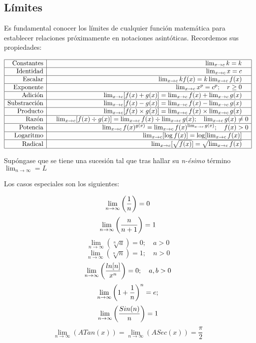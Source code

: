 \documentclass[tikz,11pt,fleqn]{book} %
\begin{document}
\subsection{Límites}
Es fundamental conocer los límites de cualquier función matemática para establecer relaciones próximamente en notaciones asintóticas. Recordemos sus propiedades:

$$\begin{array} {|r|r|}
    \hline  \text{Constantes}
        & \quad\lim_{x\to c}k
        =k    \quad\\
    \hline  \text{Identidad}
        & \quad\lim_{x\to c}x
        =c    \quad\\
    \hline  \text{Escalar}
        & \quad\lim_{x\to c}kf(x)
        =k\lim_{x\to c}f(x)    \quad\\
    \hline  \text{Exponente}
        & \quad\lim_{x\to c}x^p
        =c^p;    \quad r\ge0\quad\\
    \hline  \text{Adición}
        & \quad\lim_{x\to c}[f(x)+g(x)]
        =\lim_{x\to c}f(x)+\lim_{x\to c}g(x)    \quad\\
    \hline  \text{Substracción}
        & \quad\lim_{x\to c}[f(x)-g(x)]
        =\lim_{x\to c}f(x)-\lim_{x\to c}g(x)    \quad\\
    \hline  \text{Producto}
        & \quad\lim_{x\to c}[f(x)\times g(x)]
        =\lim_{x\to c}f(x)\times\lim_{x\to c}g(x)    \quad\\
    \hline  \text{Razón}
        & \quad\lim_{x\to c}[f(x)\div g(x)]
        =\lim_{x\to c}f(x)\div\lim_{x\to c}g(x);
        \quad \lim_{x\to c}g(x)\ne0\\
    \hline  \text{Potencia}
        & \quad\lim_{x\to c}f(x)^{g(x)}
        =\lim_{x\to c}f(x)^{\lim_{x\to c}g(x)};
        \quad f(x)>0\\
    \hline  \text{Logaritmo}
        & \quad\lim_{x\to c}[\log f(x)]
        =\log[\lim_{x\to c}f(x)]    \quad\\
    \hline  \text{Radical}
        & \quad\lim_{x\to c}[\sqrt{f(x)}]
        =\sqrt{\lim_{x\to c}f(x)}    \quad\\
    \hline
\end{array}$$

Supóngase que se tiene una sucesión tal que tras hallar su \textit{n-ésimo} término $\lim_{n\to\infty}=L$

Los casos especiales son los siguientes:

$$
    \lim_{n\to\infty}\left( \frac1n \right)=0
$$ $$
    \lim_{n\to\infty}\left( \frac n{n+1} \right)=1
$$ $$
    \lim_{n\to\infty}(\sqrt[n]{a})=0;\quad a>0
$$ $$
    \lim_{n\to\infty}(\sqrt[n]n)=1;\quad n>0
$$ $$
    \lim_{n\to\infty}\left( \frac{ln[n]}{x^n} \right)=0;\quad a,b>0
$$ $$
    \lim_{n\to\infty}\left( 1+\frac1n \right)^n=e;
$$ $$
    \lim_{n\to\infty}\left( \frac{Sin(n)}n \right)=1
$$ $$
    \lim_{n\to\infty}(ATan(x))=\lim_{n\to\infty}(ASec(x))=\frac{\pi}2
$$
\end{document}
